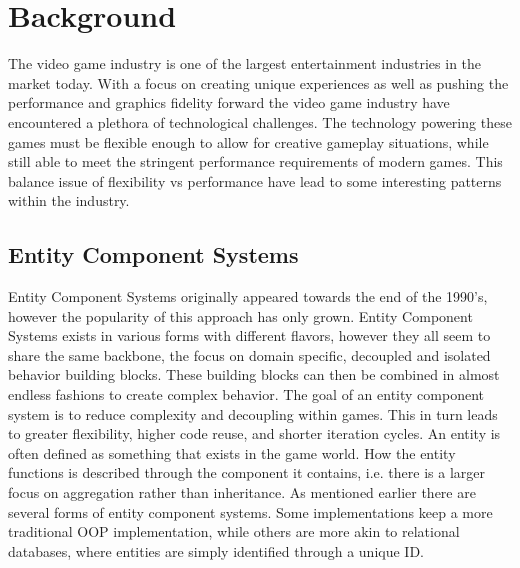 \section*{Background}
The video game industry is one of the largest entertainment industries in the market today. 
With a focus on creating unique experiences as well as pushing the performance and graphics fidelity
forward the video game industry have encountered a plethora of technological challenges.
The technology powering these games must be flexible enough to allow for creative gameplay situations, 
while still able to meet the stringent performance requirements of modern games.
This balance issue of flexibility vs performance have lead to some interesting patterns within the industry.

\subsection*{Entity Component Systems}
Entity Component Systems originally appeared towards the end of the 1990's, 
however the popularity of this approach has only grown. 
\cite{wikipedia_ecs_history}
Entity Component Systems exists in various forms with different flavors,
however they all seem to share the same backbone, the focus on domain specific, 
decoupled and isolated behavior building blocks.
These building blocks can then be combined in almost endless fashions to create complex behavior. 
The goal of an entity component system is to reduce complexity and decoupling within games. 
This in turn leads to greater flexibility, higher code reuse, and shorter iteration cycles. 
An entity is often defined as something that exists in the game world. 
How the entity functions is described through the component it contains, 
i.e. there is a larger focus on aggregation rather than inheritance. 
\cite[components]{game_programming_patterns}
As mentioned earlier there are several forms of entity component systems. 
Some implementations keep a more traditional OOP implementation, 
\cite[components]{game_programming_patterns}
while others are more akin to relational databases, 
where entities are simply identified through a unique ID. 
\cite{t_machine_ecs_are_the_future_p2} 

